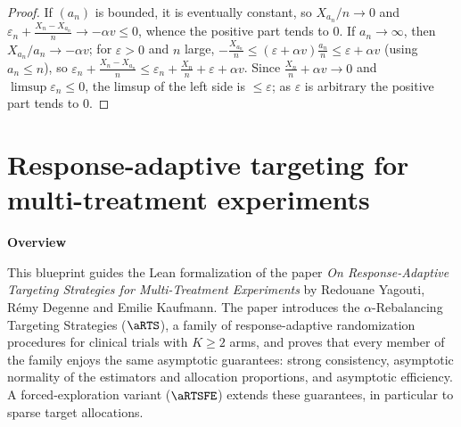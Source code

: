 \begin{proof}\leanok
If $(a_n)$ is bounded, it is eventually constant, so $X_{a_n}/n \to 0$ and
$\varepsilon_n + \frac{X_n - X_{a_n}}{n} \to -\alpha v \le 0$, whence the positive
part tends to $0$. If $a_n \to \infty$, then $X_{a_n}/a_n \to -\alpha v$; for
$\varepsilon>0$ and $n$ large, $-\frac{X_{a_n}}{n} \le (\varepsilon + \alpha v)\frac{a_n}{n}
 \le \varepsilon + \alpha v$ (using $a_n \le n$), so
$\varepsilon_n + \frac{X_n - X_{a_n}}{n} \le \varepsilon_n + \frac{X_n}{n} + \varepsilon + \alpha v$.
Since $\frac{X_n}{n} + \alpha v \to 0$ and $\limsup \varepsilon_n \le 0$, the
limsup of the left side is $\le \varepsilon$; as $\varepsilon$ is arbitrary the
positive part tends to $0$.
\end{proof}


%

\part{Response-adaptive targeting for multi-treatment experiments}

\textbf{Overview}

This blueprint guides the Lean formalization of the paper
\emph{On Response-Adaptive Targeting Strategies for Multi-Treatment Experiments}
by Redouane Yagouti, Rémy Degenne and Emilie Kaufmann. The paper introduces the
$\alpha$-Rebalancing Targeting Strategies ($\aRTS$), a family of response-adaptive
randomization procedures for clinical trials with $K \geq 2$ arms, and proves
that every member of the family enjoys the same asymptotic guarantees: strong
consistency, asymptotic normality of the estimators and allocation proportions,
and asymptotic efficiency. A forced-exploration variant ($\aRTSFE$) extends these
guarantees, in particular to sparse target allocations.

